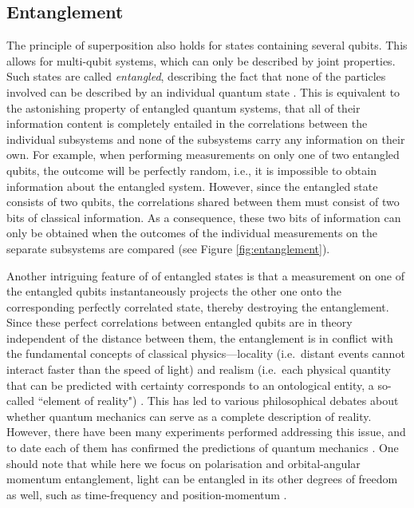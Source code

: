 \documentclass{article}
\begin{document}
\subsection{Entanglement}
The principle of superposition also holds for states containing several qubits. This allows for multi-qubit systems, which can only be described by joint properties. Such states are called \textit{entangled}, describing the fact that none of the particles involved can be described by an individual quantum state \cite{schrodinger1935gegenwartige,Einstein:1935hx,Bell:1964wu}. This is equivalent to the astonishing property of entangled quantum systems, that all of their information content is completely entailed in the correlations between the individual subsystems and none of the subsystems carry any information on their own. For example, when performing measurements on only one of two entangled qubits, the outcome will be perfectly random, i.e., it is impossible to obtain information about the entangled system. However, since the entangled state consists of two qubits, the correlations shared between them must consist of two bits of classical information. As a consequence, these two bits of information can only be obtained when the outcomes of the individual measurements on the separate subsystems are compared (see Figure \ref{fig:entanglement}).

Another intriguing feature of of entangled states is that a measurement on one of the entangled qubits instantaneously projects the other one onto the corresponding perfectly correlated state, thereby destroying the entanglement. Since these perfect correlations between entangled qubits are in theory independent of the distance between them, the entanglement is in conflict with the fundamental concepts of classical physics---locality (i.e.~distant events cannot interact faster than the speed of light) and realism (i.e.~each physical quantity that can be predicted with certainty corresponds to an ontological entity, a so-called ``element of reality") \cite{Bell:1964wu}. This has led to various philosophical debates about whether quantum mechanics can serve as a complete description of reality. However, there have been many experiments performed addressing this issue, and to date each of them has confirmed the predictions of quantum mechanics \cite{freedman1972experimental,aspect1982experimental,weihs1998violation,rowe2001experimental,scheidl2010violation}. One should note that while here we focus on polarisation and orbital-angular momentum entanglement, light can be entangled in its other degrees of freedom as well, such as time-frequency \cite{Franson:1989uu,Jha:2008wu} and position-momentum \cite{Klyshko:1988eea,Bennink:2004df,Leach:2012wb}.
\end{document}
